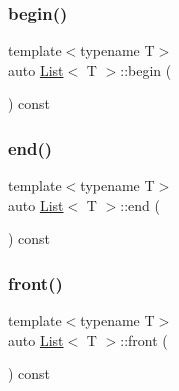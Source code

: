 \mbox{\label{struct_list_afa6f9828eab89e2fcae63b612927fabb}} 
\subsubsection{\texorpdfstring{begin()}{begin()}}
{\footnotesize\ttfamily template$<$typename T$>$ \\
auto \hyperlink{struct_list}{List}$<$ T $>$\+::begin (\begin{DoxyParamCaption}{ }\end{DoxyParamCaption}) const\hspace{0.3cm}{\ttfamily [inline]}}

\mbox{\label{struct_list_a22f91e0dfc7ab053952fc8ed33e5cd53}} 
\subsubsection{\texorpdfstring{end()}{end()}}
{\footnotesize\ttfamily template$<$typename T$>$ \\
auto \hyperlink{struct_list}{List}$<$ T $>$\+::end (\begin{DoxyParamCaption}{ }\end{DoxyParamCaption}) const\hspace{0.3cm}{\ttfamily [inline]}}

\mbox{\label{struct_list_a4efaea597a8cea09cc9e7717e6a9f80a}} 
\subsubsection{\texorpdfstring{front()}{front()}}
{\footnotesize\ttfamily template$<$typename T$>$ \\
auto \hyperlink{struct_list}{List}$<$ T $>$\+::front (\begin{DoxyParamCaption}{ }\end{DoxyParamCaption}) const\hspace{0.3cm}{\ttfamily [inline]}}

\mbox{\label{struct_list_a40b4d77cbee9b7c311c304cafbf07d1e}} 
